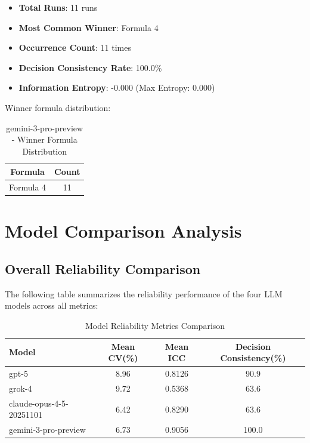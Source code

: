 \documentclass[12pt,a4paper]{article}
\begin{document}
\begin{itemize}
    \item \textbf{Total Runs}: 11 runs
    \item \textbf{Most Common Winner}: Formula 4
    \item \textbf{Occurrence Count}: 11 times
    \item \textbf{Decision Consistency Rate}: 100.0\%
    \item \textbf{Information Entropy}: -0.000 (Max Entropy: 0.000)
\end{itemize}

Winner formula distribution:

\begin{table}[H]
\centering
\caption{gemini-3-pro-preview - Winner Formula Distribution}
\begin{tabular}{cc}
\toprule
\textbf{Formula} & \textbf{Count} \\
\midrule
Formula 4 & 11 \\
\bottomrule
\end{tabular}
\end{table}


\newpage


\section{Model Comparison Analysis}

\subsection{Overall Reliability Comparison}

The following table summarizes the reliability performance of the four LLM models across all metrics:

\begin{table}[H]
\centering
\caption{Model Reliability Metrics Comparison}
\begin{tabular}{lccc}
\toprule
\textbf{Model} & \textbf{Mean CV(\%)} & \textbf{Mean ICC} & \textbf{Decision Consistency(\%)} \\
\midrule
gpt-5 & 8.96 & 0.8126 & 90.9 \\
grok-4 & 9.72 & 0.5368 & 63.6 \\
claude-opus-4-5-20251101 & 6.42 & 0.8290 & 63.6 \\
gemini-3-pro-preview & 6.73 & 0.9056 & 100.0 \\
\bottomrule
\end{tabular}
\end{table}
\end{document}
